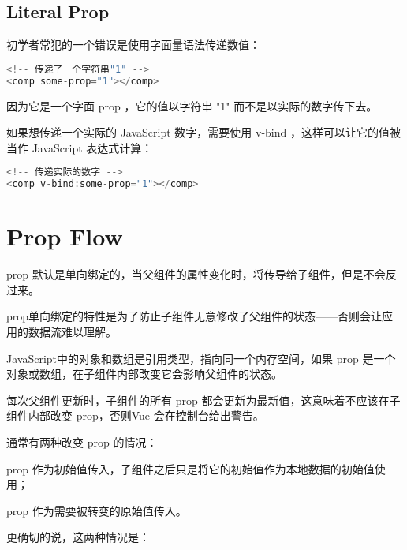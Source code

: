 \subsection{Literal Prop}


初学者常犯的一个错误是使用字面量语法传递数值：

\begin{lstlisting}[language=JavaScript]
<!-- 传递了一个字符串"1" -->
<comp some-prop="1"></comp>
\end{lstlisting}


因为它是一个字面 prop ，它的值以字符串 "1" 而不是以实际的数字传下去。


如果想传递一个实际的 JavaScript 数字，需要使用 v-bind ，这样可以让它的值被当作 JavaScript 表达式计算：



\begin{lstlisting}[language=JavaScript]
<!-- 传递实际的数字 -->
<comp v-bind:some-prop="1"></comp>
\end{lstlisting}


\section{Prop Flow}




prop 默认是单向绑定的，当父组件的属性变化时，将传导给子组件，但是不会反过来。

prop单向绑定的特性是为了防止子组件无意修改了父组件的状态——否则会让应用的数据流难以理解。

JavaScript中的对象和数组是引用类型，指向同一个内存空间，如果 prop 是一个对象或数组，在子组件内部改变它会影响父组件的状态。

每次父组件更新时，子组件的所有 prop 都会更新为最新值，这意味着不应该在子组件内部改变 prop，否则Vue 会在控制台给出警告。



通常有两种改变 prop 的情况：

\begin{compactenum}
\item prop 作为初始值传入，子组件之后只是将它的初始值作为本地数据的初始值使用；
\item prop 作为需要被转变的原始值传入。
\end{compactenum}

更确切的说，这两种情况是：

